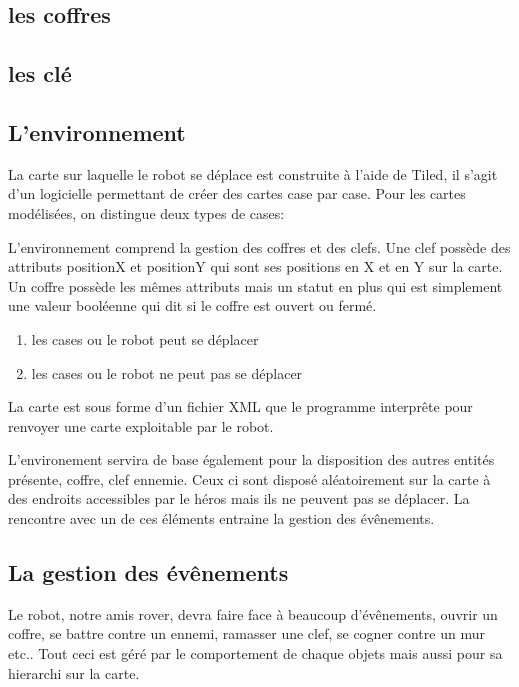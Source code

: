 \documentclass[a4paper 12pts]{article}
\begin{document}
\subsection{les coffres}

\subsection{les clé}

\subsection{L'environnement}
La carte sur laquelle le robot se déplace est construite à l'aide de Tiled, il s'agit d'un logicielle permettant de créer des cartes case par case. 
Pour les cartes modélisées, on distingue deux types de cases:

L'environnement comprend la gestion des coffres et des clefs.
Une clef possède des attributs positionX et positionY qui sont ses positions en X et en Y sur la carte. 
Un coffre possède les mêmes attributs mais un statut en plus qui est simplement une valeur booléenne qui dit si le coffre est ouvert ou fermé.


\begin{enumerate}
	\item les cases ou le robot peut se déplacer
	\item les cases ou le robot ne peut pas se déplacer
\end{enumerate}

La carte est sous forme d'un fichier XML que le programme interprête pour renvoyer une carte exploitable par le robot.

L'environement servira de base également pour la disposition des autres entités présente, coffre, clef ennemie.
Ceux ci sont disposé aléatoirement sur la carte à des endroits accessibles par le héros mais ils ne peuvent pas se déplacer.
La rencontre avec un de ces éléments entraine la gestion des évênements.





\subsection{La gestion des évênements}

Le robot, notre amis rover, devra faire face à beaucoup d'évênements, ouvrir un coffre, se battre contre un ennemi, ramasser une clef, se cogner contre un mur etc..
Tout ceci est géré par le comportement de chaque objets mais aussi pour sa hierarchi sur la carte.
\end{document}
